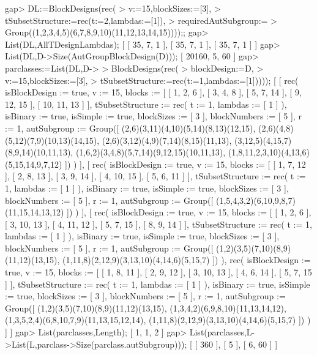 \beginexample
gap> DL:=BlockDesigns(rec(
>    v:=15,blockSizes:=[3],
>    tSubsetStructure:=rec(t:=2,lambdas:=[1]),
>    requiredAutSubgroup:=
>       Group((1,2,3,4,5)(6,7,8,9,10)(11,12,13,14,15))));;
gap> List(DL,AllTDesignLambdas);
[ [ 35, 7, 1 ], [ 35, 7, 1 ], [ 35, 7, 1 ] ]
gap> List(DL,D->Size(AutGroupBlockDesign(D)));
[ 20160, 5, 60 ]
gap> parclasses:=List(DL,D->
>    BlockDesigns(rec(
>       blockDesign:=D,
>       v:=15,blockSizes:=[3],
>       tSubsetStructure:=rec(t:=1,lambdas:=[1]))));
[ [ rec( isBlockDesign := true, v := 15, 
          blocks := [ [ 1, 2, 6 ], [ 3, 4, 8 ], [ 5, 7, 14 ], [ 9, 12, 15 ], 
              [ 10, 11, 13 ] ], 
          tSubsetStructure := rec( t := 1, lambdas := [ 1 ] ), 
          isBinary := true, isSimple := true, blockSizes := [ 3 ], 
          blockNumbers := [ 5 ], r := 1, 
          autSubgroup := Group([ (2,6)(3,11)(4,10)(5,14)(8,13)(12,15), 
              (2,6)(4,8)(5,12)(7,9)(10,13)(14,15), 
              (2,6)(3,12)(4,9)(7,14)(8,15)(11,13), 
              (3,12,5)(4,15,7)(8,9,14)(10,11,13), 
              (1,6,2)(3,4,8)(5,7,14)(9,12,15)(10,11,13), 
              (1,8,11,2,3,10)(4,13,6)(5,15,14,9,7,12) ]) ) ], 
  [ rec( isBlockDesign := true, v := 15, 
          blocks := [ [ 1, 7, 12 ], [ 2, 8, 13 ], [ 3, 9, 14 ], 
              [ 4, 10, 15 ], [ 5, 6, 11 ] ], 
          tSubsetStructure := rec( t := 1, lambdas := [ 1 ] ), 
          isBinary := true, isSimple := true, blockSizes := [ 3 ], 
          blockNumbers := [ 5 ], r := 1, 
          autSubgroup := Group([ (1,5,4,3,2)(6,10,9,8,7)(11,15,14,13,12) ]) ) 
     ], 
  [ rec( isBlockDesign := true, v := 15, blocks := [ [ 1, 2, 6 ], [ 3, 10, 13 
                 ], [ 4, 11, 12 ], [ 5, 7, 15 ], [ 8, 9, 14 ] ], 
          tSubsetStructure := rec( t := 1, lambdas := [ 1 ] ), 
          isBinary := true, isSimple := true, blockSizes := [ 3 ], 
          blockNumbers := [ 5 ], r := 1, 
          autSubgroup := Group([ (1,2)(3,5)(7,10)(8,9)(11,12)(13,15), 
              (1,11,8)(2,12,9)(3,13,10)(4,14,6)(5,15,7) ]) ), 
      rec( isBlockDesign := true, v := 15, 
          blocks := [ [ 1, 8, 11 ], [ 2, 9, 12 ], [ 3, 10, 13 ], 
              [ 4, 6, 14 ], [ 5, 7, 15 ] ], 
          tSubsetStructure := rec( t := 1, lambdas := [ 1 ] ), 
          isBinary := true, isSimple := true, blockSizes := [ 3 ], 
          blockNumbers := [ 5 ], r := 1, 
          autSubgroup := Group([ (1,2)(3,5)(7,10)(8,9)(11,12)(13,15), 
              (1,3,4,2)(6,9,8,10)(11,13,14,12), 
              (1,3,5,2,4)(6,8,10,7,9)(11,13,15,12,14), 
              (1,11,8)(2,12,9)(3,13,10)(4,14,6)(5,15,7) ]) ) ] ]
gap> List(parclasses,Length);
[ 1, 1, 2 ]
gap> List(parclasses,L->List(L,parclass->Size(parclass.autSubgroup)));
[ [ 360 ], [ 5 ], [ 6, 60 ] ]
\endexample
